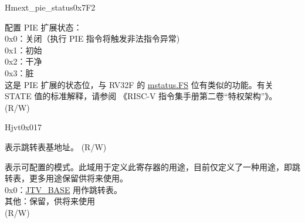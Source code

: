 \begin{register}{H}{mext\_pie\_status}{0x7F2}\label{regdesc:MEXT_PIE_STATUS}%
%
%
\regnewline%
\begin{regdesc}\begin{reglist}
\label{fielddesc:MEXT_PIE_STATE}\item [STATE] 配置 PIE 扩展状态：\\
0x0：关闭（执行 PIE 指令将触发非法指令异常) \\
0x1：初始 \\
0x2：干净 \\
0x3：脏 \\
这是 PIE 扩展的状态位，与 RV32F 的 \hyperref[fielddesc:MSTATUS_FS]{mstatus.FS} 位有类似的功能。有关 STATE 值的标准解释，请参阅 《RISC-V 指令集手册第二卷“特权架构”》。\\ (R/W)
\end{reglist}\end{regdesc}
\end{register}


\begin{register}{H}{jvt}{0x017}\label{regdesc:JVT}%
%
%
\regnewline%
\begin{regdesc}\begin{reglist}
\label{fielddesc:JVT_BASE}\item [BASE] 表示跳转表基地址。 (R/W)
\label{fielddesc:JVT_MODE}\item [MODE] 表示可配置的模式。此域用于定义此寄存器的用途，目前仅定义了一种用途，即跳转表，更多用途保留供将来使用。\\
0x0：\hyperref[fielddesc:JVT_BASE]{JTV\_BASE} 用作跳转表。\\
其他：保留，供将来使用\\
(R/W)
\end{reglist}\end{regdesc}
\end{register}

